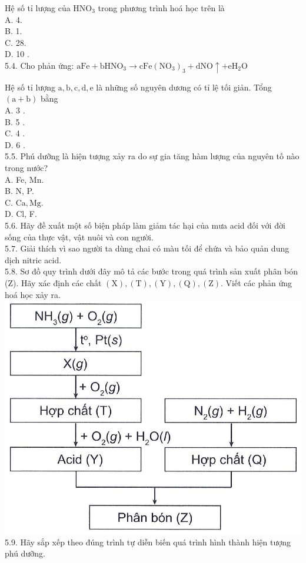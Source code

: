 \documentclass[10pt]{article}
\begin{document}
Hệ số tỉ lượng của $\mathrm{HNO}_{3}$ trong phương trình hoá học trên là\\
A. 4.\\
B. 1.\\
C. 28.\\
D. 10 .\\
5.4. Cho phản ứng: $\mathrm{aFe}+\mathrm{bHNO}_{3} \rightarrow \mathrm{cFe}\left(\mathrm{NO}_{3}\right)_{3}+\mathrm{dNO} \uparrow+\mathrm{eH}_{2} \mathrm{O}$

Hệ số tỉ lượng $\mathrm{a}, \mathrm{b}, \mathrm{c}, \mathrm{d}, \mathrm{e}$ là những số nguyên dương có tỉ lệ tối giản. Tổng $(\mathrm{a}+\mathrm{b})$ bằng\\
A. 3 .\\
B. 5 .\\
C. 4 .\\
D. 6 .\\
5.5. Phú dưỡng là hiện tượng xảy ra do sự gia tăng hàm lượng của nguyên tố nào trong nước?\\
A. Fe, Mn.\\
B. N, P.\\
C. $\mathrm{Ca}, \mathrm{Mg}$.\\
D. Cl, F.\\
5.6. Hãy đề xuất một số biện pháp làm giảm tác hại của mưa acid đối với đời sống của thực vật, vật nuôi và con người.\\
5.7. Giải thích vì sao người ta dùng chai có màu tối để chứa và bảo quản dung dịch nitric acid.\\
5.8. Sơ đồ quy trình dưới đây mô tả các bước trong quá trình sản xuất phân bón (Z). Hãy xác định các chất $(\mathrm{X}),(\mathrm{T}),(\mathrm{Y}),(\mathrm{Q}),(\mathrm{Z})$. Viết các phản ứng hoá học xảy ra.\\
\includegraphics[max width=\textwidth, center]{2025_10_23_ae7aef68fb3b41082d29g-09}\\
5.9. Hãy sắp xếp theo đúng trình tự diễn biến quá trình hình thành hiện tượng phú dưỡng.
\end{document}
